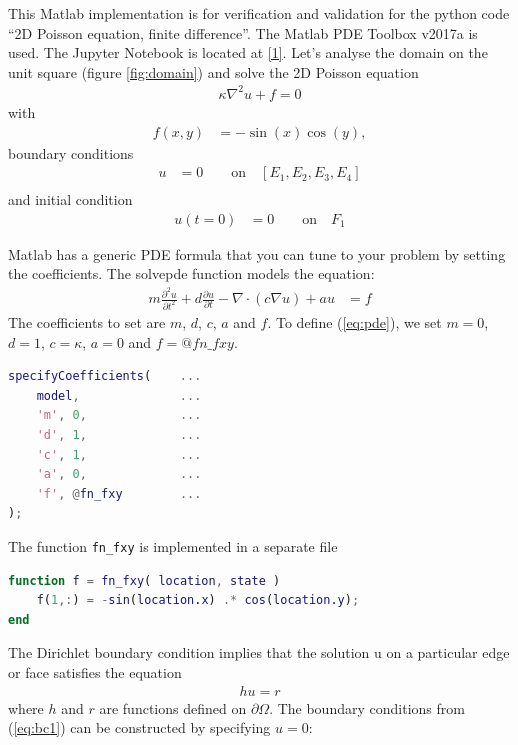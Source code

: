\documentclass[11pt, a4paper]{article}
\begin{document}
This Matlab implementation is for verification and validation for the python code ``2D Poisson equation, finite difference''. The Matlab PDE Toolbox v2017a is used. The Jupyter Notebook is located at \href{https://github.com/gilbertfrancois/partial-differential-equations/blob/ffee191364d9a2417bef08f517cab05114de68c5/notebook/2D%20Poisson%20equation,%20finite%20difference.ipynb}{[1]}. Let's analyse the domain on the unit square (figure \ref{fig:domain}) and solve the 2D Poisson equation 
\begin{align}
\kappa \nabla^2 u + f = 0\label{eq:pde}
\end{align}
with
\begin{align}
f(x, y) &= -\sin(x)\cos(y),
\end{align}
boundary conditions
\begin{align}
u &= 0 \qquad \textrm{on} \quad [E_1, E_2, E_3, E_4] \label{eq:bc1}\\
\end{align}
and initial condition
\begin{align}
u(t=0) &= 0	\qquad \textrm{on} \quad F_1 \label{eq:init}
\end{align}


Matlab has a generic PDE formula that you can tune to your problem by setting the coefficients. The solvepde function models the equation:
\begin{align}
m\frac{\partial^2 u}{\partial t^2} + d\frac{\partial u}{\partial t} - \nabla \cdot (c\nabla u) + au &= f \label{eq:pde_ref}	
\end{align}
The coefficients to set are $m$, $d$, $c$, $a$ and $f$. To define (\ref{eq:pde}), we set $m=0$, $d=1$, $c=\kappa$, $a=0$ and $f=@fn\_fxy$.

\begin{lstlisting}[language=Matlab]
%% Specify the PDE model
specifyCoefficients(    ...
    model,              ...
    'm', 0,             ...
    'd', 1,             ...
    'c', 1,             ...
    'a', 0,             ...
    'f', @fn_fxy        ...
);
\end{lstlisting}
The function \texttt{fn\_fxy} is implemented in a separate file

\begin{lstlisting}[language=Matlab]
%% file: fn_fxy.m
function f = fn_fxy( location, state )
    f(1,:) = -sin(location.x) .* cos(location.y);
end
\end{lstlisting}

The Dirichlet boundary condition implies that the solution u on a particular edge or face satisfies the equation
\begin{align}
	hu = r
\end{align}
where $h$ and $r$ are functions defined on $\partial \Omega$. The boundary conditions from (\ref{eq:bc1}) can be constructed by specifying $u=0$:
\end{document}
